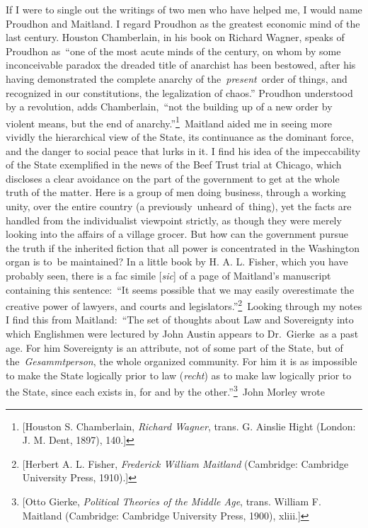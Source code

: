 \documentclass[twoside,symmetric,nobib,justified]{tufte-book}
\begin{document}
If I were to single out the writings of two men who have helped me, I
would name Proudhon and Maitland. I regard Proudhon as the greatest
economic mind of the last century. Houston Chamberlain, in his book on
Richard Wagner, speaks of Proudhon as~``one of the most acute minds of
the century, on whom by some inconceivable paradox the dreaded title of
anarchist has been bestowed, after his having demonstrated the complete
anarchy of the~\emph{present}~order of things, and recognized in our
constitutions, the legalization of chaos.'' Proudhon understood by a
revolution, adds Chamberlain,~``not the building up of a new order by
violent means, but the end of anarchy.''\footnote{{[}Houston S.
  Chamberlain, \emph{Richard Wagner}, trans. G. Ainslie Hight \emph{}
  (London: J. M. Dent, 1897), 140.{]}}~Maitland aided me in seeing more
vividly the hierarchical view of the State, its continuance as the
dominant force, and the danger to social peace that lurks in it. I find
his idea of the impeccability of the State exemplified in the news of
the Beef Trust trial at Chicago, which discloses a clear avoidance on
the part of the government to get at the whole truth of the matter. Here
is a group of men doing business, through a working unity, over the
entire country (a previously~unheard of~thing), yet the facts are
handled from the individualist viewpoint strictly, as though they were
merely looking into the affairs of a village grocer. But how can the
government pursue the truth if the inherited fiction that all power is
concentrated in the Washington organ is to~be maintained? In a little
book by H. A. L. Fisher, which you have probably seen, there is a fac
simile {[}\emph{sic}{]} of a page of Maitland's manuscript containing
this sentence:~``It seems possible that we may easily overestimate the
creative power of lawyers, and courts and
legislators.''\footnote{{[}Herbert A. L. Fisher, \emph{Frederick William
  Maitland} (Cambridge: Cambridge University Press, 1910).{]}}~Looking
through my notes I find this from Maitland:~``The set of thoughts about
Law and Sovereignty into which Englishmen were lectured by John Austin
appears to Dr.~Gierke~as a past age. For him Sovereignty is an
attribute, not of some part of the State, but of
the~\emph{Gesammtperson}, the whole organized community. For him it is
as impossible to make the State logically prior to law (\emph{recht}) as
to make law logically prior to the State, since each exists in, for and
by the other.''\footnote{{[}Otto Gierke, \emph{Political Theories of the
  Middle Age}, trans. William F. Maitland \emph{} (Cambridge: Cambridge
  University Press, 1900), \emph{} xliii.{]}}~John Morley wrote
\end{document}
